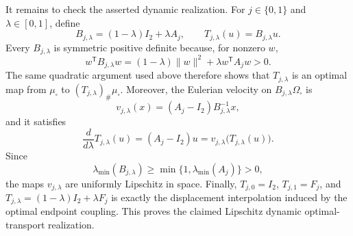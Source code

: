 It remains to check the asserted dynamic realization.  For \(j\in\{0,1\}\) and \(\lambda\in[0,1]\), define
\[
B_{j,\lambda}=(1-\lambda)I_2+\lambda A_j,
\qquad T_{j,\lambda}(u)=B_{j,\lambda}u.
\]
Every \(B_{j,\lambda}\) is symmetric positive definite because, for nonzero \(w\),
\[
w^{\mathsf T}B_{j,\lambda}w
=(1-\lambda)\lVert w\rVert^2
 +\lambda w^{\mathsf T}A_jw>0.
\]
The same quadratic argument used above therefore shows that \(T_{j,\lambda}\) is an optimal map from \(\mu_{\square}\) to \((T_{j,\lambda})_{\#}\mu_{\square}\).  Moreover, the Eulerian velocity on \(B_{j,\lambda}\Omega_{\square}\) is
\[
v_{j,\lambda}(x)=(A_j-I_2)B_{j,\lambda}^{-1}x,
\]
and it satisfies
\[
\frac{d}{d\lambda}T_{j,\lambda}(u)
=(A_j-I_2)u
=v_{j,\lambda}\bigl(T_{j,\lambda}(u)\bigr).
\]
Since
\[
\lambda_{\min}(B_{j,\lambda})
\ge \min\{1,\lambda_{\min}(A_j)\}>0,
\]
the maps \(v_{j,\lambda}\) are uniformly Lipschitz in space.  Finally, \(T_{j,0}=I_2\), \(T_{j,1}=F_j\), and \(T_{j,\lambda}=(1-\lambda)I_2+\lambda F_j\) is exactly the displacement interpolation induced by the optimal endpoint coupling.  This proves the claimed Lipschitz dynamic optimal-transport realization.

